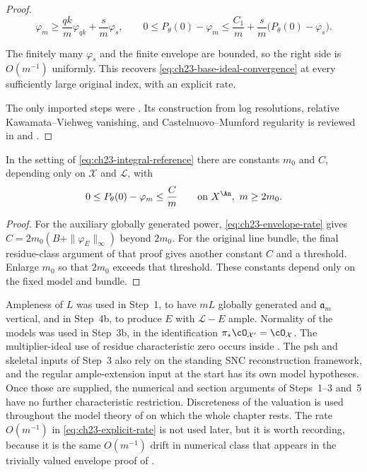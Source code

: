 \begin{proof}
\[
 \varphi_m\geq\frac{qk}{m}\varphi_{qk}+\frac{s}{m}\varphi_s,
 \qquad
 0\leq P_\theta(0)-\varphi_m
 \leq\frac{C_1}{m}+\frac{s}{m}\bigl(P_\theta(0)-\varphi_s\bigr).
\]

The finitely many $\varphi_s$ and the finite envelope are bounded, so
the right side is $O(m^{-1})$ uniformly.  This recovers
\eqref{eq:ch23-base-ideal-convergence} at every sufficiently large
original index, with an explicit rate.

The only imported steps were
.  Its construction from log
resolutions, relative Kawamata--Viehweg vanishing, and
Castelnuovo--Mumford regularity is reviewed in
 and
.
\end{proof}

\begin{corollary}
\label{cor:ch23-envelope-rate}
In the setting of \eqref{eq:ch23-integral-reference} there are constants
$m_0$ and $C$, depending only on $\mathcal X$ and $\mathcal L$, with
\begin{equation}\label{eq:ch23-explicit-rate}
  0\leq P_\theta(0)-\varphi_m\leq\frac{C}{m}
 \qquad\text{on }X^{\An},\ m\geq 2m_0 .
\end{equation}
\end{corollary}

\begin{proof}
For the auxiliary globally generated power,
\eqref{eq:ch23-envelope-rate} gives
$C=2m_0(B+\|\varphi_E\|_\infty)$ beyond $2m_0$.  For the original
line bundle, the final residue-class argument of that proof gives another
constant $C$ and a threshold.  Enlarge $m_0$ so that $2m_0$ exceeds that
threshold.  These constants depend only on the fixed model and bundle.
\end{proof}

\begin{remark}
\label{rem:ch23-base-ideal-hypotheses}
Ampleness of $L$ was used in Step~1, to have $mL$ globally generated and
$\mathfrak a_m$ vertical, and in Step~4b, to produce $E$ with
$\mathcal L-E$ ample.  Normality of the models was used in Step~3b, in the
identification $\pi_*\cO_{\mathcal X'}=\cO_{\mathcal X}$.  The multiplier-ideal use of residue characteristic zero occurs inside
.  The psh and skeletal inputs
of Step~3 also rely on the standing SNC reconstruction framework, and the
regular ample-extension input at the start has its own model hypotheses.
Once those are supplied, the numerical and section arguments of
Steps~1--3 and~5 have no further characteristic restriction.  Discreteness of the valuation is
used throughout the model theory of  on which the
whole chapter rests.  The rate $O(m^{-1})$ in
\eqref{eq:ch23-explicit-rate} is not used later, but it is worth recording,
because it is the same $O(m^{-1})$ drift in numerical class that appears
in the trivially valued envelope proof of
.
\end{remark}

